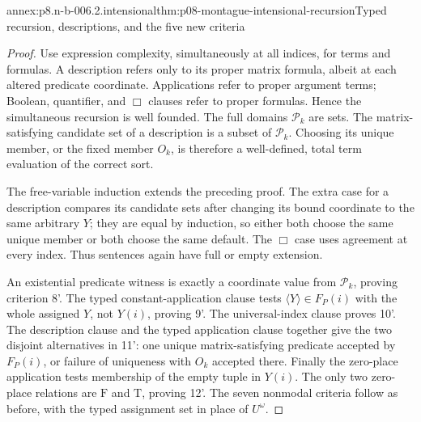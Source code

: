 \begin{annexitem}{annex:p8.n-b-006.2.intensional}{thm:p08-montague-intensional-recursion}{Typed recursion, descriptions, and the five new criteria}
\begin{proof}
Use expression complexity, simultaneously at all indices, for terms and
formulas. A description refers only to its proper matrix formula, albeit
at each altered predicate coordinate. Applications refer to proper
argument terms; Boolean, quantifier, and \(\Box\) clauses refer to
proper formulas. Hence the simultaneous recursion is well founded.
The full domains \(\mathcal P_k\) are sets. The matrix-satisfying
candidate set of a description is a subset of \(\mathcal P_k\).
Choosing its unique member, or the fixed member \(O_k\), is therefore
a well-defined, total term evaluation of the correct sort.

The free-variable induction extends the preceding proof. The extra
case for a description compares its candidate sets after changing its
bound coordinate to the same arbitrary \(Y\); they are equal by
induction, so either both choose the same unique member or both choose
the same default. The \(\Box\) case uses agreement at every index.
Thus sentences again have full or empty extension.

An existential predicate witness is exactly a coordinate value from
\(\mathcal P_k\), proving criterion 8'. The typed constant-application
clause tests \(\langle Y\rangle\in F_P(i)\) with the whole assigned \(Y\), not
\(Y(i)\), proving 9'. The universal-index clause proves 10'. The
description clause and the typed application clause together give the
two disjoint alternatives in 11': one unique matrix-satisfying predicate
accepted by \(F_P(i)\), or failure of uniqueness with \(O_k\) accepted
there. Finally the zero-place application tests membership of the empty
tuple in \(Y(i)\). The only two zero-place relations are \(\mathrm F\)
and \(\mathrm T\), proving 12'. The seven nonmodal criteria follow
as before, with the typed assignment set in place of \(U^\omega\).
\end{proof}
\end{annexitem}

